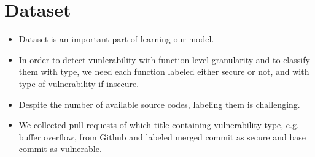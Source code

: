 \section{Dataset}

\begin{itemize}
\item
Dataset is an important part of learning our model.

\item
In order to detect vunlerability with function-level granularity and to classify them with type,
we need each function labeled either secure or not, and with type of vulnerability if insecure.

\item
Despite the number of available source codes, labeling them is challenging.

\item
We collected pull requests of which title containing vulnerability type, e.g. buffer overflow, from Github and labeled merged commit as secure and base commit as vulnerable.
\end{itemize}